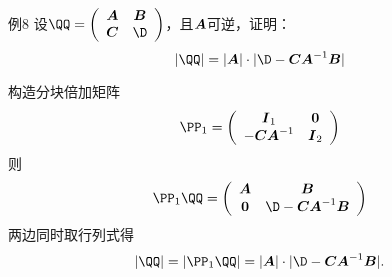 \begin{frame}
  \begin{footnotesize}
    \begin{exampleblock}{例8}
      设$\QQ=\left(
      \begin{array}{cc}
        \A&\B\\
        \C&\D
      \end{array}
      \right)$，且$\boldsymbol{A}$可逆，证明：
      $$
      |\QQ| = |\A| \cdot |\D-\C\A^{-1}\B|
      $$
    \end{exampleblock}
    \pause
    \jiename
    构造分块倍加矩阵
    $$
    \PP_1 = \left(
    \begin{array}{cc}
      \II_1 & \zero\\
      -\C\A^{-1} & \II_2
    \end{array}
    \right)
    $$\pause 
    则
    $$
    \PP_1 \QQ = \left(
    \begin{array}{cc}
      \A & \B\\
      \zero & \D-\C\A^{-1}\B
    \end{array}
    \right)
    $$
    \pause
    两边同时取行列式得
    $$
    |\QQ| = |\PP_1\QQ| = |\A|\cdot |\D-\C\A^{-1}\B|.
    $$
  \end{footnotesize}
\end{frame}

